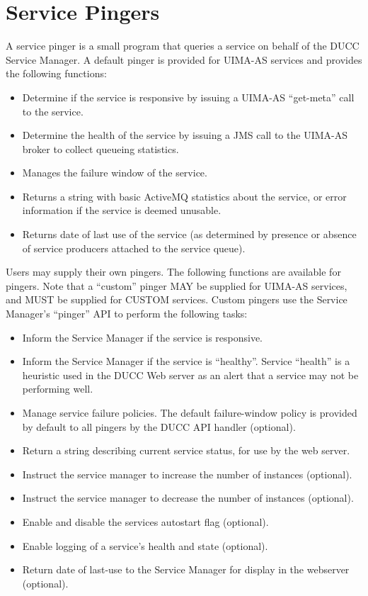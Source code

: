       \section{Service Pingers}
      \label{sec:service.pingers}
      A service pinger is a small program that queries a service on behalf of the DUCC Service
      Manager.  A default pinger is provided for UIMA-AS services and provides the following
      functions:
      \begin{itemize}
        \item Determine if the service is responsive by issuing a UIMA-AS ``get-meta'' call 
          to the service.
        \item Determine the health of the service by issuing a JMS call to the UIMA-AS broker
          to collect queueing statistics.
        \item Manages the failure window of the service.
        \item Returns a string with basic ActiveMQ statistics about the service, or
          error information if the service is deemed unusable.
        \item Returns date of last use of the service (as determined by presence or
          absence of service producers attached to the service queue).
      \end{itemize}

      Users may supply their own pingers.  The following functions are available for
      pingers.  Note that a ``custom'' pinger MAY be supplied for UIMA-AS services, and
      MUST be supplied for CUSTOM services.  Custom pingers use the Service Manager's
      ``pinger'' API to perform the following tasks:
      \begin{itemize}
        \item Inform the Service Manager if the service is responsive.
        \item Inform the Service Manager if the service is ``healthy''.  Service ``health''
          is a heuristic used in the DUCC Web server as an alert that a service may
          not be performing well.
        \item Manage service failure policies. The default failure-window policy is
          provided by default to all pingers by the DUCC API handler (optional).
        \item Return a string describing current service status, for use by the
          web server.
        \item Instruct the service manager to increase the number of instances (optional).
        \item Instruct the service manager to decrease the number of instances (optional).
        \item Enable and disable the services autostart flag (optional).
        \item Enable logging of a service's health and state (optional).
        \item Return date of last-use to the Service Manager for display in the
          webserver (optional).
      \end{itemize}

